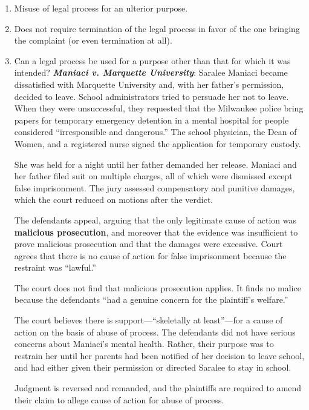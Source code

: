 \begin{enumerate}
    \item Misuse of legal process for an ulterior purpose.
    \item Does not require termination of the legal process in favor of the one bringing the complaint (or even termination at all).
    \item Can a legal process be used for a purpose other than that for which it was intended? \textbf{\emph{Maniaci v. Marquette University}}: Saralee Maniaci became dissatisfied with Marquette University and, with her father's permission, decided to leave. School administrators tried to persuade her not to leave. When they were unsuccessful, they requested that the Milwaukee police bring papers for temporary emergency detention in a mental hospital for people considered ``irresponsible and dangerous.'' The school physician, the Dean of Women, and a registered nurse signed the application for temporary custody.

She was held for a night until her father demanded her release. Maniaci and her father filed suit on multiple charges, all of which were dismissed except false imprisonment. The jury assessed compensatory and punitive damages, which the court reduced on motions after the verdict.

The defendants appeal, arguing that the only legitimate cause of action was \textbf{malicious prosecution}, and moreover that the evidence was insufficient to prove malicious prosecution and that the damages were excessive. Court agrees that there is no cause of action for false imprisonment because the restraint was ``lawful.''

The court does not find that malicious prosecution applies. It finds no malice because the defendants ``had a genuine concern for the plaintiff's welfare.''

The court believes there is support---``skeletally at least''---for a cause of action on the basis of abuse of process. The defendants did not have serious concerns about Maniaci's mental health. Rather, their purpose was to restrain her until her parents had been notified of her decision to leave school, and had either given their permission or directed Saralee to stay in school.

Judgment is reversed and remanded, and the plaintiffs are required to amend their claim to allege cause of action for abuse of process.


\end{enumerate}

